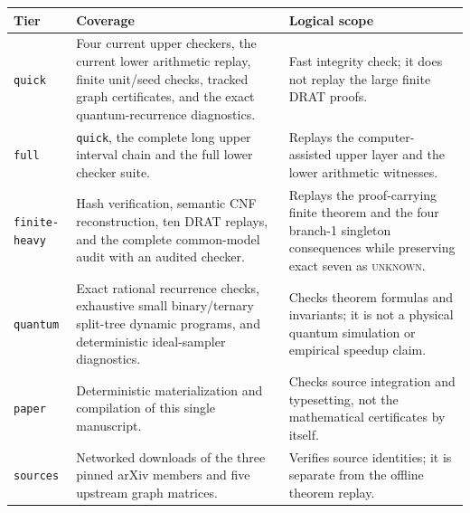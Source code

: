 \begin{center}
\begin{tabularx}{\textwidth}{@{}lXX@{}}
\toprule
Tier & Coverage & Logical scope \\
\midrule
\texttt{quick} & Four current upper checkers, the current lower arithmetic
replay, finite unit/seed checks, tracked graph certificates, and the exact
quantum-recurrence diagnostics. & Fast
integrity check; it does not replay the large finite DRAT proofs. \\
\texttt{full} & \texttt{quick}, the complete long upper interval chain and
the full lower checker suite. & Replays the computer-assisted upper layer and
the lower arithmetic witnesses. \\
\texttt{finite-heavy} & Hash verification, semantic CNF reconstruction, ten
DRAT replays, and the complete common-model audit with an audited checker. &
Replays the proof-carrying finite theorem and the four branch-1 singleton
consequences while preserving exact seven as \textsc{unknown}. \\
\texttt{quantum} & Exact rational recurrence checks, exhaustive small
binary/ternary split-tree dynamic programs, and deterministic ideal-sampler
diagnostics. & Checks theorem formulas and invariants; it is not a physical
quantum simulation or empirical speedup claim. \\
\texttt{paper} & Deterministic materialization and compilation of this single
manuscript. & Checks source integration and typesetting, not the mathematical
certificates by itself. \\
\texttt{sources} & Networked downloads of the three pinned arXiv members and
five upstream graph matrices. & Verifies source identities; it is separate
from the offline theorem replay. \\
\bottomrule
\end{tabularx}
\end{center}

